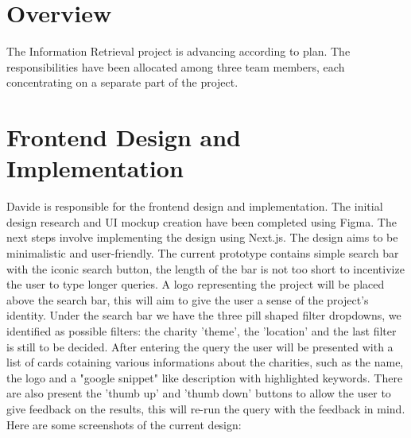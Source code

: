 \documentclass[unicode,9pt,a4paper,oneside,numbers=endperiod,openany]{scrartcl}
\begin{document}
\setassignment
{}

\newline


\section{Overview}
The Information Retrieval project is advancing according to plan. The responsibilities have been allocated among three team members, each concentrating on a separate part of the project.

\section{Frontend Design and Implementation}
Davide is responsible for the frontend design and implementation. The initial design research and UI mockup creation have been completed using Figma. The next steps involve implementing the design using Next.js.
The design aims to be minimalistic and user-friendly.
The current prototype contains simple search bar with the iconic search button, the length of the bar is not too short to incentivize the user to type longer queries.
A logo representing the project will be placed above the search bar, this will aim to give the user a sense of the project's identity.
Under the search bar we have the three pill shaped filter dropdowns, we identified as possible filters: the charity 'theme', the 'location' and the last filter is still to be decided.
After entering the query the user will be presented with a list of cards cotaining various informations about the charities, such as the name, the logo and a "google snippet" like description with highlighted keywords.
There are also present the 'thumb up' and 'thumb down' buttons to allow the user to give feedback on the results, this will re-run the query with the feedback in mind.
\\Here are some screenshots of the current design:
\end{document}
